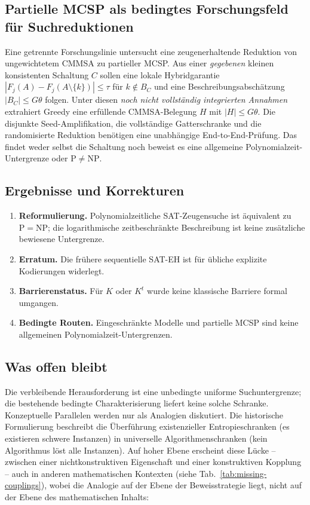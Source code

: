 \documentclass[aps,prd,twocolumn,superscriptaddress,nofootinbib]{revtex4-2}
\theoremstyle{definition}
\theoremstyle{remark}
\newcommand{\NP}{\mathrm{NP}}
\newcommand{\PP}{\mathrm{P}}
\begin{document}
\subsection{Partielle MCSP als bedingtes Forschungsfeld für Suchreduktionen}
\label{sec:partial-mcsp-transfer}
Eine getrennte Forschungslinie untersucht eine zeugenerhaltende
Reduktion von ungewichtetem CMMSA zu partieller MCSP.
Aus einer \emph{gegebenen} kleinen konsistenten Schaltung $C$
sollen eine lokale Hybridgarantie
$|F_j(A)-F_j(A\setminus\{k\})|\le\tau$ für $k\notin B_C$
und eine Beschreibungsabschätzung $|B_C|\le G\theta$ folgen.
Unter diesen \emph{noch nicht vollständig integrierten Annahmen}
extrahiert Greedy eine erfüllende CMMSA-Belegung $H$ mit
$|H|\le G\theta$. Die disjunkte Seed-Amplifikation,
die vollständige Gatterschranke und die randomisierte
Reduktion benötigen eine unabhängige End-to-End-Prüfung.
Das findet weder selbst die Schaltung noch beweist es eine
allgemeine Polynomialzeit-Untergrenze oder $\PP\ne\NP$.



\subsection{Ergebnisse und Korrekturen}
\begin{enumerate}
\item \textbf{Reformulierung.} Polynomialzeitliche SAT-Zeugensuche
ist äquivalent zu $\PP=\NP$; die logarithmische zeitbeschränkte
Beschreibung ist keine zusätzliche bewiesene Untergrenze.
\item \textbf{Erratum.} Die frühere sequentielle SAT-EH
ist für übliche explizite Kodierungen widerlegt.
\item \textbf{Barrierenstatus.} Für $K$ oder $K^t$ wurde keine
klassische Barriere formal umgangen.
\item \textbf{Bedingte Routen.} Eingeschränkte Modelle und partielle
MCSP sind keine allgemeinen Polynomialzeit-Untergrenzen.
\end{enumerate}

\subsection{Was offen bleibt}

Die verbleibende Herausforderung ist eine unbedingte uniforme Suchuntergrenze; die bestehende bedingte Charakterisierung liefert keine solche Schranke. Konzeptuelle Parallelen werden nur als Analogien diskutiert. Die historische Formulierung beschreibt die Überführung existenzieller Entropieschranken (\glqq es existieren schwere Instanzen\grqq{}) in universelle Algorithmenschranken (\glqq kein Algorithmus löst alle Instanzen\grqq{}). Auf hoher Ebene erscheint diese Lücke -- zwischen einer nichtkonstruktiven Eigenschaft und einer konstruktiven Kopplung -- auch in anderen mathematischen Kontexten (siehe Tab.~\ref{tab:missing-couplings}), wobei die Analogie auf der Ebene der Beweisstrategie liegt, nicht auf der Ebene des mathematischen Inhalts:
\end{document}

